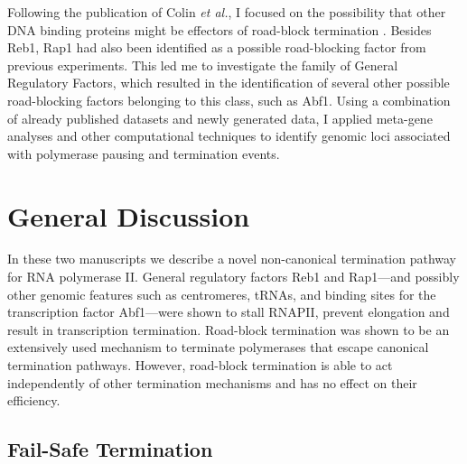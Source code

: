 Following the publication of Colin \textit{et al.}, I focused on the possibility that other DNA binding proteins might be effectors of road-block termination \invivo{}. 
Besides Reb1, Rap1 had also been identified as a possible road-blocking factor from previous experiments. 
This led me to investigate the family of General Regulatory Factors, which resulted in the identification of several other possible road-blocking factors belonging to this class, such as Abf1. 
Using a combination of already published datasets and newly generated data, I applied meta-gene analyses and other computational techniques to identify genomic loci associated with polymerase pausing and termination events. 


\clearpage





\clearpage

\section{General Discussion}


In these two manuscripts we describe a novel non-canonical termination pathway for RNA polymerase II.
General regulatory factors Reb1 and Rap1—and possibly other genomic features such as centromeres, tRNAs, and binding sites for the transcription factor Abf1—were shown to stall RNAPII, prevent elongation and result in transcription termination.  
Road-block termination was shown to be an extensively used mechanism to terminate polymerases that escape canonical termination pathways. 
However, road-block termination is able to act independently of other termination mechanisms and has no effect on their efficiency. 

\subsection{Fail-Safe Termination}

